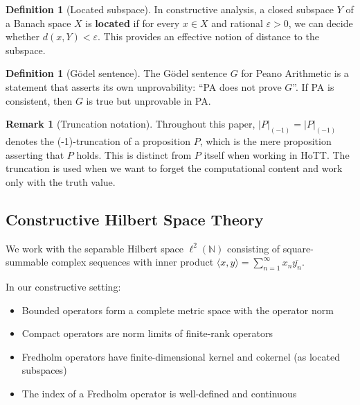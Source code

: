 \documentclass[11pt]{article}
\theoremstyle{definition}
\newtheorem{definition}[theorem]{Definition}
\newtheorem{remark}[theorem]{Remark}
\newcommand{\N}{\mathbb{N}}
\newcommand{\lp}{\ell^{2}(\N)}
\newcommand{\trunc}[1]{\lvert #1\rvert_{(-1)}}
\begin{document}
\begin{definition}[Located subspace]
In constructive analysis, a closed subspace $Y$ of a Banach space $X$ is \textbf{located} if for every $x \in X$ and rational $\varepsilon > 0$, we can decide whether $d(x,Y) < \varepsilon$. This provides an effective notion of distance to the subspace.
\end{definition}

\begin{definition}[Gödel sentence]
The Gödel sentence $G$ for Peano Arithmetic is a statement that asserts its own unprovability: ``PA does not prove $G$''. If PA is consistent, then $G$ is true but unprovable in PA.
\end{definition}

\begin{remark}[Truncation notation]
Throughout this paper, $\trunc{P} = |P|_{(-1)}$ denotes the (-1)-truncation of a proposition $P$, which is the mere proposition asserting that $P$ holds. This is distinct from $P$ itself when working in HoTT. The truncation is used when we want to forget the computational content and work only with the truth value.
\end{remark}

\subsection{Constructive Hilbert Space Theory}

We work with the separable Hilbert space $\lp$ consisting of square-summable complex sequences with inner product $\langle x,y \rangle = \sum_{n=1}^{\infty} x_n \overline{y_n}$. 

In our constructive setting:
\begin{itemize}
\item Bounded operators form a complete metric space with the operator norm
\item Compact operators are norm limits of finite-rank operators
\item Fredholm operators have finite-dimensional kernel and cokernel (as located subspaces)
\item The index of a Fredholm operator is well-defined and continuous
\end{itemize}
\end{document}
